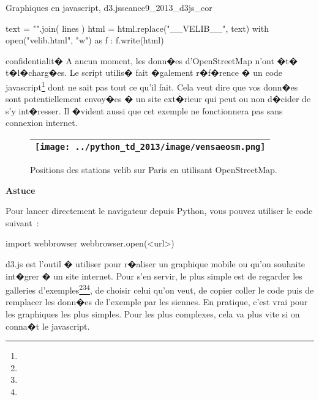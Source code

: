 \begin{xtd}{Graphiques en javascript, d3.js}{seance9_2013_d3js_cor}
\begin{verbatimx}
text = "\n".join( lines )
html = html.replace("__VELIB__", text)
with open("velib.html", "w") as f : f.write(html)
\end{verbatimx}


\begin{xremark}{confidentialit�}
A aucun moment, les donn�es d'OpenStreetMap n'ont �t� t�l�charg�es. Le script utilis� fait �galement r�f�rence � un code javascript\footnote{} dont ne sait pas tout ce qu'il fait. Cela veut dire que vos donn�es sont potentiellement envoy�es � un site ext�rieur qui peut ou non d�cider de s'y int�resser. Il �vident aussi que cet exemple ne fonctionnera pas sans connexion internet. 
\end{xremark}

\begin{figure}[ht]
\begin{center}\begin{tabular}{|c|}\hline 
\texttt{[image: ../python\_td\_2013/image/vensaeosm.png]} \\ \hline
\end{tabular}
\end{center}
\caption{Positions des stations velib sur Paris en utilisant OpenStreetMap.}
\label{td9_vensaeosm}
\end{figure}

\textbf{Astuce}

Pour lancer directement le navigateur depuis Python, vous pouvez utiliser le code suivant~:

\begin{verbatimx}
import webbrowser
webbrowser.open(<url>)
\end{verbatimx}



d3.js est l'outil � utiliser pour r�aliser un graphique mobile ou qu'on souhaite int�grer � un site internet. Pour s'en servir, le plus simple est de regarder les galleries d'exemples\footnote{}\footnote{}\footnote{}, de choisir celui qu'on veut, de copier coller le code puis de remplacer les donn�es de l'exemple par les siennes. En pratique, c'est vrai pour les graphiques les plus simples. Pour les plus complexes, cela va plus vite si on conna�t le javascript.


\end{xtd}
